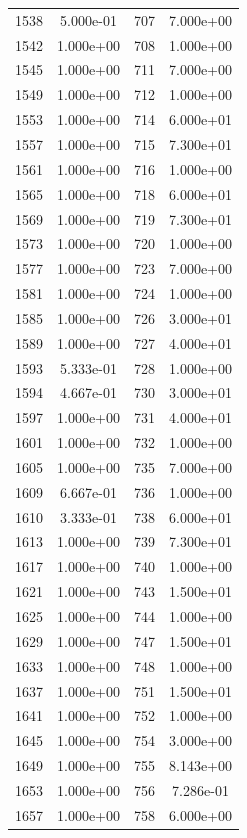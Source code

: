 \documentclass[12pt]{article}
\begin{document}
\begin{longtable}{@{}cccc@{}}
1538 & 5.000e-01 & 707 & 7.000e+00 \\
1542 & 1.000e+00 & 708 & 1.000e+00 \\
1545 & 1.000e+00 & 711 & 7.000e+00 \\
1549 & 1.000e+00 & 712 & 1.000e+00 \\
1553 & 1.000e+00 & 714 & 6.000e+01 \\
1557 & 1.000e+00 & 715 & 7.300e+01 \\
1561 & 1.000e+00 & 716 & 1.000e+00 \\
1565 & 1.000e+00 & 718 & 6.000e+01 \\
1569 & 1.000e+00 & 719 & 7.300e+01 \\
1573 & 1.000e+00 & 720 & 1.000e+00 \\
1577 & 1.000e+00 & 723 & 7.000e+00 \\
1581 & 1.000e+00 & 724 & 1.000e+00 \\
1585 & 1.000e+00 & 726 & 3.000e+01 \\
1589 & 1.000e+00 & 727 & 4.000e+01 \\
1593 & 5.333e-01 & 728 & 1.000e+00 \\
1594 & 4.667e-01 & 730 & 3.000e+01 \\
1597 & 1.000e+00 & 731 & 4.000e+01 \\
1601 & 1.000e+00 & 732 & 1.000e+00 \\
1605 & 1.000e+00 & 735 & 7.000e+00 \\
1609 & 6.667e-01 & 736 & 1.000e+00 \\
1610 & 3.333e-01 & 738 & 6.000e+01 \\
1613 & 1.000e+00 & 739 & 7.300e+01 \\
1617 & 1.000e+00 & 740 & 1.000e+00 \\
1621 & 1.000e+00 & 743 & 1.500e+01 \\
1625 & 1.000e+00 & 744 & 1.000e+00 \\
1629 & 1.000e+00 & 747 & 1.500e+01 \\
1633 & 1.000e+00 & 748 & 1.000e+00 \\
1637 & 1.000e+00 & 751 & 1.500e+01 \\
1641 & 1.000e+00 & 752 & 1.000e+00 \\
1645 & 1.000e+00 & 754 & 3.000e+00 \\
1649 & 1.000e+00 & 755 & 8.143e+00 \\
1653 & 1.000e+00 & 756 & 7.286e-01 \\
1657 & 1.000e+00 & 758 & 6.000e+00 \\

\bottomrule
\end{longtable}
\end{document}
